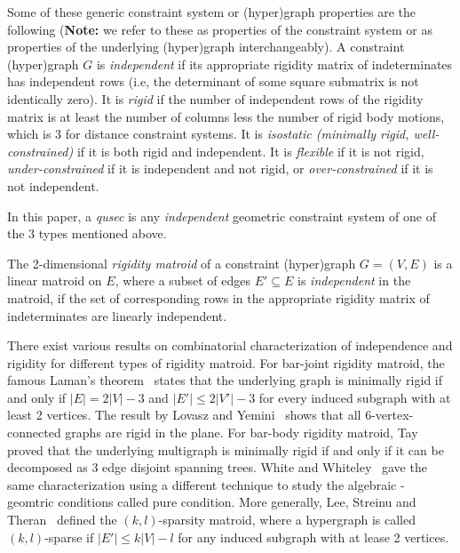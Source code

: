 Some of these generic constraint system or 
(hyper)graph properties are the following ({\bf Note:} we refer to these as
properties of the constraint system or as properties of the underlying
(hyper)graph interchangeably).
%
A constraint (hyper)graph $G$ is {\em independent} if its appropriate rigidity matrix of indeterminates  
has independent rows
(i.e, the determinant of some square submatrix is not
identically zero). 
It is {\em rigid} if the number of independent rows of the rigidity matrix is
at least the number of columns less the number of rigid body motions, 
which is 3 for distance constraint systems. 
It is {\em isostatic (minimally rigid, well-constrained)} 
if it is both rigid and independent. 
It is {\em flexible} if it is not rigid, {\em under-constrained} if it is independent and not rigid, or {\em over-constrained} if it is not independent.


In this paper, a {\em qusec} is any {\em independent} geometric 
constraint system of one of the 3
types mentioned above.




The 2-dimensional {\em rigidity matroid} of a constraint (hyper)graph $G = (V,E)$ is a linear matroid  on $E$, 
where a subset of edges $E' \subseteq E$ is {\em independent} in the matroid, 
if the set of corresponding rows in the appropriate rigidity matrix of indeterminates are linearly independent. 

There exist various results on combinatorial characterization of independence and rigidity
for different types of  rigidity matroid. 
For bar-joint rigidity matroid, 
the famous Laman's theorem~\cite{???} states that the underlying graph
is minimally rigid if and only if $|E| = 2|V|-3$ and $|E'| \le 2|V'|-3$ for every induced subgraph with at least 2 vertices. 
The result by Lovasz and Yemini~\cite{???} shows that all 6-vertex-connected graphs are rigid in the plane. 
For bar-body rigidity matroid,
Tay~\cite{???} proved that
the underlying multigraph is minimally rigid if and only if it can be decomposed as $3$ edge disjoint spanning trees. 
White and Whiteley~\cite{???} gave the same characterization using a different technique to study the algebraic - geomtric conditions called pure condition.
More generally, 
Lee, Streinu and Theran~\cite{???} defined the $(k,l)$-sparsity matroid,
where a hypergraph is called $(k,l)$-sparse if $|E'| \le k|V| - l$ for any induced subgraph with at lease 2 vertices.  

